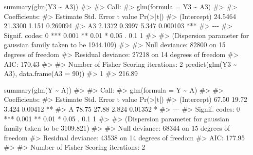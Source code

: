 \documentclass[
  10pt,
  a4paper,
]{book}
\newenvironment{Shaded}{\begin{snugshade}}{\end{snugshade}}
\newcommand{\AttributeTok}[1]{\textcolor[rgb]{0.40,0.45,0.13}{#1}}
\newcommand{\CommentTok}[1]{\textcolor[rgb]{0.37,0.37,0.37}{#1}}
\newcommand{\DecValTok}[1]{\textcolor[rgb]{0.68,0.00,0.00}{#1}}
\newcommand{\FunctionTok}[1]{\textcolor[rgb]{0.28,0.35,0.67}{#1}}
\newcommand{\NormalTok}[1]{\textcolor[rgb]{0.00,0.46,0.62}{#1}}
\newcommand{\SpecialCharTok}[1]{\textcolor[rgb]{0.37,0.37,0.37}{#1}}
\begin{document}
\begin{Shaded}
\begin{Highlighting}[]

\FunctionTok{summary}\NormalTok{(}\FunctionTok{glm}\NormalTok{(Y3 }\SpecialCharTok{\textasciitilde{}}\NormalTok{ A3))}
\CommentTok{\#\textgreater{} }
\CommentTok{\#\textgreater{} Call:}
\CommentTok{\#\textgreater{} glm(formula = Y3 \textasciitilde{} A3)}
\CommentTok{\#\textgreater{} }
\CommentTok{\#\textgreater{} Coefficients:}
\CommentTok{\#\textgreater{}             Estimate Std. Error t value Pr(\textgreater{}|t|)    }
\CommentTok{\#\textgreater{} (Intercept)  24.5464    21.3300   1.151 0.269094    }
\CommentTok{\#\textgreater{} A3            2.1372     0.3997   5.347 0.000103 ***}
\CommentTok{\#\textgreater{} {-}{-}{-}}
\CommentTok{\#\textgreater{} Signif. codes:  0 \textquotesingle{}***\textquotesingle{} 0.001 \textquotesingle{}**\textquotesingle{} 0.01 \textquotesingle{}*\textquotesingle{} 0.05 \textquotesingle{}.\textquotesingle{} 0.1 \textquotesingle{} \textquotesingle{} 1}
\CommentTok{\#\textgreater{} }
\CommentTok{\#\textgreater{} (Dispersion parameter for gaussian family taken to be 1944.109)}
\CommentTok{\#\textgreater{} }
\CommentTok{\#\textgreater{}     Null deviance: 82800  on 15  degrees of freedom}
\CommentTok{\#\textgreater{} Residual deviance: 27218  on 14  degrees of freedom}
\CommentTok{\#\textgreater{} AIC: 170.43}
\CommentTok{\#\textgreater{} }
\CommentTok{\#\textgreater{} Number of Fisher Scoring iterations: 2}
\FunctionTok{predict}\NormalTok{(}\FunctionTok{glm}\NormalTok{(Y3 }\SpecialCharTok{\textasciitilde{}}\NormalTok{ A3), }\FunctionTok{data.frame}\NormalTok{(}\AttributeTok{A3 =} \DecValTok{90}\NormalTok{))}
\CommentTok{\#\textgreater{}      1 }
\CommentTok{\#\textgreater{} 216.89}

\FunctionTok{summary}\NormalTok{(}\FunctionTok{glm}\NormalTok{(Y }\SpecialCharTok{\textasciitilde{}}\NormalTok{ A))}
\CommentTok{\#\textgreater{} }
\CommentTok{\#\textgreater{} Call:}
\CommentTok{\#\textgreater{} glm(formula = Y \textasciitilde{} A)}
\CommentTok{\#\textgreater{} }
\CommentTok{\#\textgreater{} Coefficients:}
\CommentTok{\#\textgreater{}             Estimate Std. Error t value Pr(\textgreater{}|t|)   }
\CommentTok{\#\textgreater{} (Intercept)    67.50      19.72   3.424  0.00412 **}
\CommentTok{\#\textgreater{} A              78.75      27.88   2.824  0.01352 * }
\CommentTok{\#\textgreater{} {-}{-}{-}}
\CommentTok{\#\textgreater{} Signif. codes:  0 \textquotesingle{}***\textquotesingle{} 0.001 \textquotesingle{}**\textquotesingle{} 0.01 \textquotesingle{}*\textquotesingle{} 0.05 \textquotesingle{}.\textquotesingle{} 0.1 \textquotesingle{} \textquotesingle{} 1}
\CommentTok{\#\textgreater{} }
\CommentTok{\#\textgreater{} (Dispersion parameter for gaussian family taken to be 3109.821)}
\CommentTok{\#\textgreater{} }
\CommentTok{\#\textgreater{}     Null deviance: 68344  on 15  degrees of freedom}
\CommentTok{\#\textgreater{} Residual deviance: 43538  on 14  degrees of freedom}
\CommentTok{\#\textgreater{} AIC: 177.95}
\CommentTok{\#\textgreater{} }
\CommentTok{\#\textgreater{} Number of Fisher Scoring iterations: 2}
\end{Highlighting}
\end{Shaded}
\end{document}
